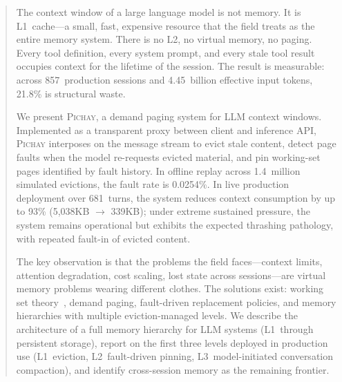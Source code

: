 \begin{abstract}
The context window of a large language model is not memory. It is
L1~cache---a small, fast, expensive resource that the field treats
as the entire memory system. There is no L2, no virtual memory, no
paging. Every tool definition, every system prompt, and every stale
tool result occupies context for the lifetime of the session. The
result is measurable: across 857~production sessions and
4.45~billion effective input tokens, 21.8\% is structural waste.

We present \textsc{Pichay}, a demand paging system for LLM context
windows. Implemented as a transparent proxy between client and
inference API, \textsc{Pichay} interposes on the message stream to
evict stale content, detect page faults when the model re-requests
evicted material, and pin working-set pages identified by fault
history. In offline replay across 1.4~million simulated evictions,
the fault rate is 0.0254\%. In live production deployment over
681~turns, the system reduces context consumption by up to 93\%
(5{,}038KB $\to$ 339KB); under extreme sustained pressure, the
system remains operational but exhibits the expected thrashing
pathology, with repeated fault-in of evicted content.

The key observation is that the problems the field faces---context
limits, attention degradation, cost scaling, lost state across
sessions---are virtual memory problems wearing different clothes.
The solutions exist: working set
theory~\citep{denning1968working}, demand paging, fault-driven
replacement policies, and memory hierarchies with multiple
eviction-managed levels. We describe the architecture of a full
memory hierarchy for LLM systems (L1~through persistent storage),
report on the first three levels deployed in production use
(L1~eviction, L2~fault-driven pinning, L3~model-initiated
conversation compaction), and identify cross-session memory as the
remaining frontier.
\end{abstract}
